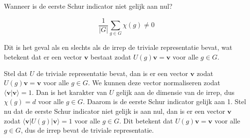 \begin{derivation}
    Wanneer is de eerste Schur indicator niet gelijk aan nul? 

    \[
    \frac{1}{|G|} \sum_{g \in G} \chi(g) \neq 0
    \]

    Dit is het geval als en slechts als de irrep de triviale representatie bevat,
    wat betekent dat er een vector \(\bm v\) bestaat zodat \(U(g)\bm v = \bm v\) voor alle \(g \in G\).

    Stel dat \(U\) de triviale representatie bevat, dan is er een vector \(\bm v\) zodat \(U(g)\bm v = \bm v\) voor alle \(g \in G\). We kunnen deze vector normaliseren zodat \(\langle \bm v | \bm v \rangle = 1\). Dan is het karakter van \(U\) gelijk aan de dimensie van de irrep, dus \(\chi(g) = d\) voor alle \(g \in G\). Daarom is de eerste Schur indicator gelijk aan 1.   
    Stel nu dat de eerste Schur indicator niet gelijk is aan nul, dan is er een vector \(\bm v\) zodat \(\langle \bm v | U(g) | \bm v \rangle = 1\) voor alle \(g \in G\). Dit betekent dat \(U(g)\bm v = \bm v\) voor alle \(g \in G\), dus de irrep bevat de triviale representatie.
\end{derivation}

